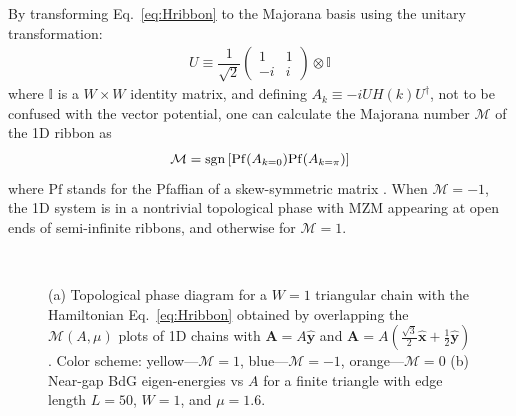 \documentclass[aps,prb,showpacs,amsmath,twocolumn,amssymb,superscriptaddress]{revtex4-2}
\let\oldhat\hat
\renewcommand{\hat}[1]{\oldhat{\mathbf{#1}}}
\begin{document}
By transforming Eq.~\eqref{eq:Hribbon} to the Majorana basis using the unitary transformation:
\begin{eqnarray}
    U\equiv \dfrac{1}{\sqrt{2}} \left(
  \begin{matrix}
    1 & 1 \\
    -i & i
  \end{matrix} \right) \otimes \mathbb{I}
\end{eqnarray}
where $\mathbb{I}$ is a ${W\times W}$ identity matrix, and defining $A_k\equiv -iU H(k) U^\dag$, not to be confused with the vector potential, one can calculate the Majorana number \cite{kitaevUnpairedMajoranaFermions2001} $\mathcal{M}$ of the 1D ribbon as \cite{liTopologicalSuperconductivityInduced2014}
\begin{eqnarray}
\mathcal{M} = {\rm sgn}\left[{{\rm Pf}(A_{k=0}) {\rm Pf}(A_{k=\pi})}\right]
\end{eqnarray}
where $\text{Pf}$ stands for the Pfaffian of a skew-symmetric matrix \cite{kitaevUnpairedMajoranaFermions2001}. When $\mathcal{M} = -1$, the 1D system is in a nontrivial topological phase with MZM appearing at open ends of semi-infinite ribbons, and otherwise for $\mathcal{M} = 1$.

\begin{figure}[ht]
  \\
\caption{(a) Topological phase diagram for a $W=1$ triangular chain with the Hamiltonian Eq.~\eqref{eq:Hribbon} obtained by overlapping the $\mathcal{M}(A, \mu)$ plots of 1D chains with $\mathbf A = A\hat{y}$ and $\mathbf A = A(\frac{\sqrt{3}}{2}\hat{x}+\frac{1}{2}\hat{y})$. Color scheme: yellow---$\mathcal{M}=1$, blue---$\mathcal{M}=-1$, orange---$\mathcal{M}=0$ (b) Near-gap BdG eigen-energies vs $A$ for a finite triangle with edge length $L = 50$, $W=1$, and $\mu=1.6$.}
  \label{fig: pd}
\end{figure}
\end{document}
